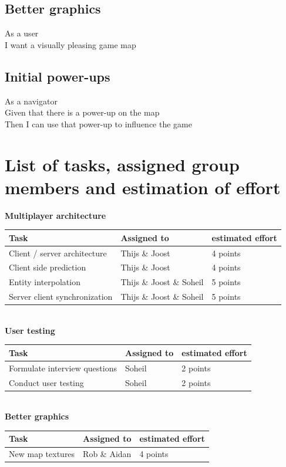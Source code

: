 \documentclass{article}
\begin{document}
\subsection*{Better graphics}
As a user\\
I want a visually pleasing game map
\subsection*{Initial power-ups}
As a navigator\\
Given that there is a power-up on the map\\
Then I can use that power-up to influence the game
\section*{List of tasks, assigned group members and estimation of effort}
\textbf{Multiplayer architecture} \\
\begin{tabular}{ | l | l | l | }
\hline
\textbf{Task} & \textbf{Assigned to} & \textbf{estimated effort} \\ \hline
Client / server architecture & Thijs \& Joost & 4 points \\ \hline
Client side prediction & Thijs \& Joost & 4 points \\\hline
Entity interpolation & Thijs \& Joost \& Soheil  & 5 points \\ \hline
Server client synchronization & Thijs \& Joost \& Soheil & 5 points \\ \hline
\end{tabular} \newline
\newline \\
\textbf{User testing} \\
\begin{tabular}{ | l | l | l | }
\hline
\textbf{Task} & \textbf{Assigned to} & \textbf{estimated effort} \\ \hline
Formulate interview questions & Soheil  & 2 points \\ \hline
Conduct user testing & Soheil & 2 points \\\hline
\end{tabular} \newline
\newline \\
\textbf{Better graphics} \\
\begin{tabular}{ | l | l | l | }
\hline
\textbf{Task} & \textbf{Assigned to} & \textbf{estimated effort} \\ \hline
New map textures & Rob \& Aidan  & 4 points \\ \hline
\end{tabular} \newline
\end{document}
